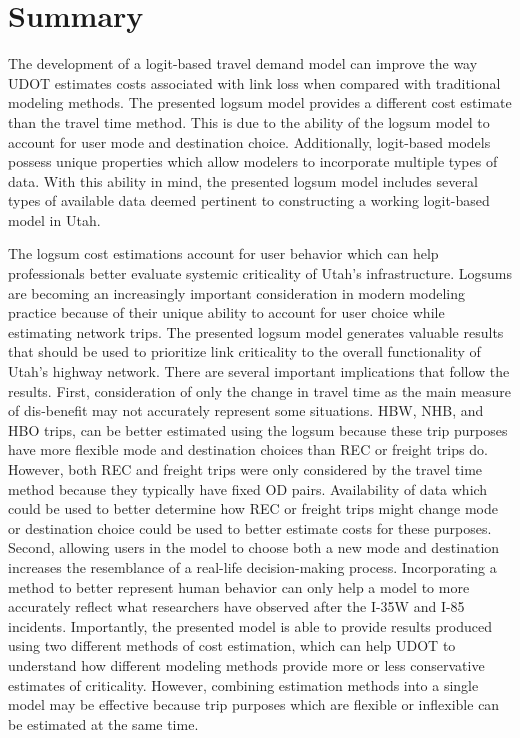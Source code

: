 \section{Summary}

The development of a logit-based travel demand model can improve the way UDOT
estimates costs associated with link loss when compared
with traditional modeling methods. The presented logsum model provides a different cost
estimate than the travel time method. This is due to the ability of the logsum
model to account for user mode and destination choice. Additionally,
logit-based models possess unique properties which allow modelers
to incorporate multiple types of data. With this ability in mind, the presented logsum model
includes several types of available data deemed pertinent to
constructing a working logit-based model in Utah.

The logsum cost estimations account for user behavior which can help professionals
better evaluate systemic criticality of Utah's infrastructure. Logsums are becoming an increasingly
important consideration in modern modeling practice because of their unique
ability to account for user choice while estimating
network trips. The presented logsum model generates valuable results that should
be used to prioritize link criticality to the overall functionality of Utah's
highway network. There are several important implications that follow the
results. First, consideration of only the change in travel time as the main measure
of dis-benefit may not accurately represent some situations. HBW, NHB, and HBO trips,
can be better estimated using the logsum because these trip purposes have more flexible
mode and destination choices than REC or freight trips do. However, both REC and
freight trips were only considered by the travel time method because they typically
have fixed OD pairs. Availability of data which could be used to better determine how
REC or freight trips might change mode or destination choice could be used to better
estimate costs for these purposes. Second, allowing users in the model
to choose both a new mode and destination increases the resemblance of a real-life
decision-making process. Incorporating a method to better represent human behavior
can only help a model to more accurately reflect what researchers have observed
after the I-35W and I-85 incidents. Importantly, the presented model is able to provide results produced
using two different methods of cost estimation, which can help UDOT to understand
how different modeling methods provide more or less conservative estimates of criticality.
However, combining estimation methods into a single model may be effective because trip purposes which
are flexible or inflexible can be estimated at the same time.

